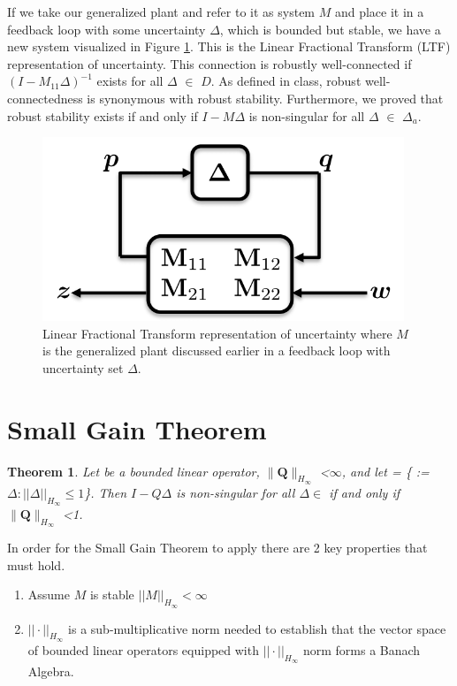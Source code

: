 \documentclass{article}[12pt]
\newtheorem{theorem}{Theorem}
\begin{document}
\noindent If we take our generalized plant and refer to it as system $M$ and place it in a feedback loop with some uncertainty $\Delta$, which is bounded but stable, we have a new system visualized in Figure \ref{simple_full_sys}.
This is the Linear Fractional Transform (LTF) representation of uncertainty.
This connection is robustly well-connected if $(I-M_{11} \Delta)^{-1}$ exists for all $\Delta$ $\in$ $D$. As defined in class, robust well-connectedness is synonymous with robust stability.
Furthermore, we proved that robust stability exists if and only if  $I-M\Delta$  is non-singular for all $\Delta$ $\in$ $\Delta_a$.

\begin{figure}[h]
    \centering
    \includegraphics[width=.5\linewidth]{images/simple_full_sys.png}
    \caption{Linear Fractional Transform representation of uncertainty where $M$ is the generalized plant discussed earlier in a feedback loop with uncertainty set $\Delta$.}
    \label{simple_full_sys}
\end{figure}

\section{Small Gain Theorem}

\begin{theorem} Let  be a bounded linear operator, $\|\boldsymbol{Q}\|_{H_\infty}$  \textless $\infty$, and let  = \{\mathds{\Delta} := ${\Delta : ||\Delta ||_{H_\infty} \leq 1}$\}. Then $I-Q\Delta$ is non-singular for all $\Delta \in$  if and only if  $\|\boldsymbol{Q}\|_{H_\infty}$ \textless 1.
\end{theorem}

\noindent In order for the Small Gain Theorem to apply there are 2 key properties that must hold. 
\begin{enumerate}
    \item Assume $M$ is stable \(||M|| _{H _\infty} < \infty\)
    
    \item \(|| \cdot||_{H_\infty} \) is a sub-multiplicative norm needed to establish that the vector space of bounded linear operators equipped with \(|| \cdot||_{H_\infty} \) norm forms a Banach Algebra. 
\end{enumerate}
\end{document}
